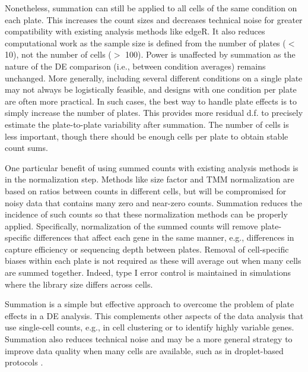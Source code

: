 \documentclass{article}
\begin{document}
Nonetheless, summation can still be applied to all cells of the same condition on each plate.
This increases the count sizes and decreases technical noise for greater compatibility with existing analysis methods like edgeR.
It also reduces computational work as the sample size is defined from the number of plates ($<$ 10), not the number of cells ($>$ 100).
Power is unaffected by summation as the nature of the DE comparison (i.e., between condition averages) remains unchanged.
More generally, including several different conditions on a single plate may not always be logistically feasible, and designs with one condition per plate are often more practical.
In such cases, the best way to handle plate effects is to simply increase the number of plates.
This provides more residual d.f. to precisely estimate the plate-to-plate variability after summation.
The number of cells is less important, though there should be enough cells per plate to obtain stable count sums.

One particular benefit of using summed counts with existing analysis methods is in the normalization step.
Methods like size factor and TMM normalization are based on ratios between counts in different cells,
    but will be compromised for noisy data that contains many zero and near-zero counts.
Summation reduces the incidence of such counts so that these normalization methods can be properly applied.
Specifically, normalization of the summed counts will remove plate-specific differences that affect each gene in the same manner, 
    e.g., differences in capture efficiency or sequencing depth between plates.
Removal of cell-specific biases within each plate is not required as these will average out when many cells are summed together.
Indeed, type I error control is maintained in simulations where the library size differs across cells.


Summation is a simple but effective approach to overcome the problem of plate effects in a DE analysis. 
This complements other aspects of the data analysis that use single-cell counts, e.g., in cell clustering or to identify highly variable genes.
Summation also reduces technical noise and may be a more general strategy to improve data quality when many cells are available,
    such as in droplet-based protocols \cite{klein2015droplet,macosko2015highly}.



\end{document}
